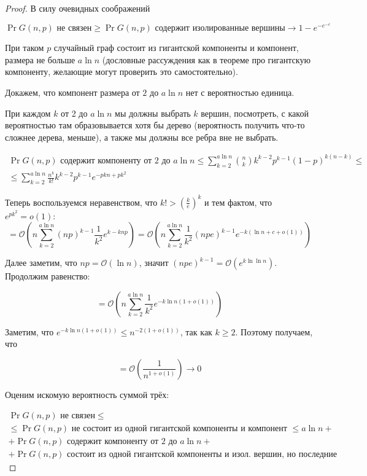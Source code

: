 \begin{proof}
  В силу очевидных соображений 

  \[
    \Pr{G(n, p) \text{ не связен}} \geq \Pr{G(n, p) \text{ содержит изолированные вершины}}
    \to 1 - e^{-e^{-c}}
  \]

  При таком $p$ случайный граф состоит из гигантской компоненты и компонент, размера
  не больше $a\ln n$ (дословные рассуждения как в теореме про гигантскую компоненту,
  желающие могут проверить это самостоятельно).

  Докажем, что компонент размера от $2$ до $a\ln n$ нет с вероятностью единица.

  При каждом $k$ от 2 до $a \ln n$ мы должны выбрать $k$ вершин, посмотреть,
  с какой вероятностью там образовывается хотя бы дерево (вероятность получить
  что-то сложнее дерева, меньше), а также мы должны все ребра вне не выбрать.

  \begin{multline}
    \Pr{G(n, p) \text{ содержит компоненту от 2 до $a\ln n$}}
    \leq \sum\limits_{k = 2}^{a\ln n} \binom{n}{k} k^{k - 2} p^{k - 1}(1 - p)^{k(n - k)}
    \leq\\\leq \sum\limits_{k = 2}^{a\ln n} \frac{n^k}{k!} k^{k - 2} p^{k - 1}e^{-pkn + pk^2}
  \end{multline}

  Теперь воспользуемся неравенством, что $k! > \left(\frac{k}{e}\right)^k$ и тем
  фактом, что $e^{pk^2} = o(1)$:
  \[
    = \mathcal{O}\left(n \sum\limits_{k = 2}^{a\ln n} (np)^{k - 1} \frac{1}{k^2}
    e^{k - knp}\right) =
    \mathcal{O}\left(n\sum\limits_{k = 2}^{a\ln n} \frac{1}{k^2} (npe)^{k - 1}
    e^{-k(\ln n + c + o(1))}\right)
  \]

  Далее заметим, что $np = \mathcal{O}(\ln n)$, значит $(npe)^{k - 1}
  = \mathcal{O}(e^{k\ln\ln n})$. Продолжим равенство:

  \[
    = \mathcal{O}\left(n\sum\limits_{k = 2}^{a\ln n} \frac{1}{k^2} e^{-k\ln n(1 + o(1))}\right)
  \]

  Заметим, что $e^{-k\ln n(1 + o(1))} \leq n^{-2(1 + o(1))}$, так
  как $k \geq 2$. Поэтому получаем, что

  \[
    = \mathcal{O}\left(\frac{1}{n^{1 + o(1)}}\right) \to 0
  \]


  Оценим искомую вероятность суммой трёх:

  \begin{multline}
    \Pr{G(n, p) \text{ не связен}} \leq\\\leq 
    \Pr{G(n, p) \text{ не состоит из одной гигантской компоненты и компонент $\leq a \ln n$}} +\\+
    \Pr{G(n, p) \text{ содержит компоненту от $2$ до $a\ln n$}} +\\+
    \Pr{G(n, p) \text{ состоит из одной гигантской компоненты и изол. вершин, но последние существуют}}
  \end{multline}


\end{proof}
